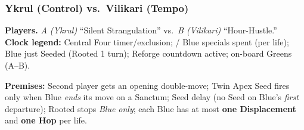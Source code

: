 \documentclass[11pt]{article}
\newcommand{\CC}[1]{\textcolor{blue!60!black}{\scriptsize\ttfamily[CF:#1]}}
\newcommand{\SC}[1]{\textcolor{red!60!black}{\scriptsize\ttfamily[S:#1]}}
\newcommand{\RoC}{\textcolor{teal!60!black}{\scriptsize\ttfamily[Rooted]}}
\newcommand{\RC}{\textcolor{purple!70!black}{\scriptsize\ttfamily[RC]}}
\newcommand{\CapC}[1]{\textcolor{green!40!black}{\scriptsize\ttfamily[G:#1]}}
\renewcommand{\RC}[1][]{%
  \textcolor{purple!70!black}{\scriptsize\ttfamily[RC%
  \if\relax\detokenize{#1}\relax\else~#1\fi]}}
\begin{document}
\subsubsection*{Ykrul (Control) vs.\ Vilikari (Tempo)}

\noindent\textbf{Players.} \textit{A (Ykrul)} “Silent Strangulation” vs.\ \textit{B (Vilikari)} “Hour-Hustle.”\\
\textbf{Clock legend:} \CC{…} Central Four timer/exclusion;\; \SC{D}/\SC{H} Blue specials spent (per life);\; \RoC{} Blue just Seeded (Rooted 1 turn);\; \RC{} Reforge countdown active;\; \CapC{a–b} on-board Greens (A–B).

\medskip
\noindent\textbf{Premises:} Second player gets an opening double-move; Twin Apex Seed fires only when Blue \emph{ends} its move on a Sanctum; Seed delay (no Seed on Blue’s \emph{first} departure); Rooted stops \emph{Blue only}; each Blue has at most \textbf{one Displacement} and \textbf{one Hop} per life.

\bigskip
\end{document}
